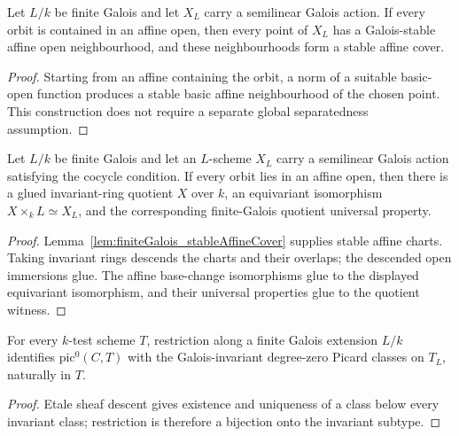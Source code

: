 \begin{lemma}
  \label{lem:finiteGalois_stableAffineCover}
  \leanok
  Let \(L/k\) be finite Galois and let \(X_L\) carry a semilinear Galois action.  If every
  orbit is contained in an affine open, then every point of \(X_L\) has a Galois-stable affine
  open neighbourhood, and these neighbourhoods form a stable affine cover.
\end{lemma}
\begin{proof}
  \leanok
  Starting from an affine containing the orbit, a norm of a suitable basic-open function
  produces a stable basic affine neighbourhood of the chosen point.  This construction does
  not require a separate global separatedness assumption.
\end{proof}

\begin{theorem}
  \label{thm:finiteGalois_schemeDescent}
  \leanok
  Let \(L/k\) be finite Galois and let an \(L\)-scheme \(X_L\) carry a semilinear Galois
  action satisfying the cocycle condition.  If every orbit lies in an affine open, then there
  is a glued invariant-ring quotient \(X\) over \(k\), an equivariant isomorphism
  \(X\times_kL\simeq X_L\), and the corresponding finite-Galois quotient universal property.
\end{theorem}
\begin{proof}
  \leanok
  Lemma~\ref{lem:finiteGalois_stableAffineCover} supplies stable affine charts.  Taking
  invariant rings descends the charts and their overlaps; the descended open immersions glue.
  The affine base-change isomorphisms glue to the displayed equivariant isomorphism, and their
  universal properties glue to the quotient witness.
\end{proof}

\begin{theorem}
  \label{thm:pic0_finiteGalois_effectiveDescent}
  \leanok
  For every \(k\)-test scheme \(T\), restriction along a finite Galois extension \(L/k\)
  identifies \(\mathrm{pic}^0(C,T)\) with the Galois-invariant degree-zero Picard classes on
  \(T_L\), naturally in \(T\).
\end{theorem}
\begin{proof}
  \leanok
  Etale sheaf descent gives existence and uniqueness of a class below every invariant class;
  restriction is therefore a bijection onto the invariant subtype.
\end{proof}


